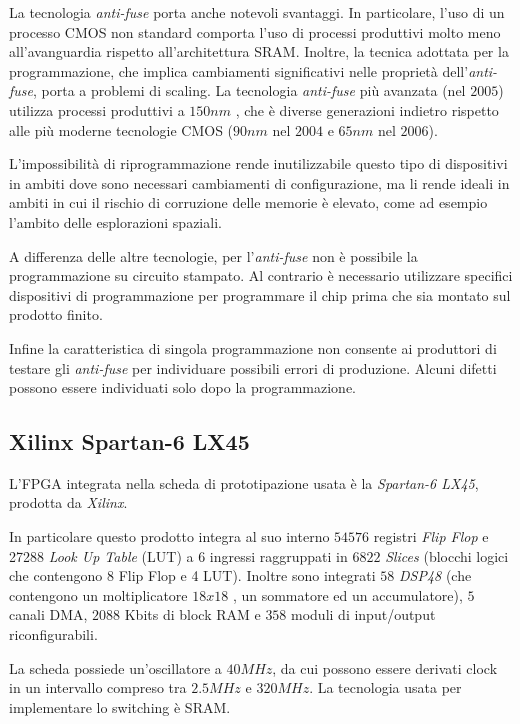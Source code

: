 La tecnologia \textit{anti-fuse} porta anche notevoli svantaggi. In particolare, l'uso di un processo CMOS non standard comporta l'uso di processi produttivi molto meno all'avanguardia rispetto all'architettura SRAM. Inoltre, la tecnica adottata per la programmazione, che implica cambiamenti significativi nelle proprietà dell'\textit{anti-fuse}, porta a problemi di scaling. La tecnologia \textit{anti-fuse} più avanzata (nel $2005$) utilizza processi produttivi a $150nm$ \cite{axfpga}, che è diverse generazioni indietro rispetto alle più moderne tecnologie CMOS ($90nm$ nel $2004$ e $65nm$ nel $2006$).

L'impossibilità di riprogrammazione rende inutilizzabile questo tipo di dispositivi in ambiti dove sono necessari cambiamenti di configurazione, ma li rende ideali in ambiti in cui il rischio di corruzione delle memorie è elevato, come ad esempio l'ambito delle esplorazioni spaziali.

A differenza delle altre tecnologie, per l'\textit{anti-fuse} non è possibile la programmazione su circuito stampato. Al contrario è necessario utilizzare specifici dispositivi di programmazione per programmare il chip prima che sia montato sul prodotto finito.

Infine la caratteristica di singola programmazione non consente ai produttori di testare gli \textit{anti-fuse} per individuare possibili errori di produzione. Alcuni difetti possono essere individuati solo dopo la programmazione.

\subsection{Xilinx Spartan-6 LX45}
L'FPGA integrata nella scheda di prototipazione usata è la \textit{Spartan-6 LX45}, prodotta da \textit{Xilinx}.

In particolare questo prodotto integra al suo interno $54576$ registri \textit{Flip Flop} e 27288 \textit{Look Up Table} (LUT) a 6 ingressi raggruppati in $6822$ \textit{Slices} (blocchi logici che contengono 8 Flip Flop e 4 LUT). Inoltre sono integrati $58$ \textit{DSP48} (che contengono un moltiplicatore $18x18$ , un sommatore ed un accumulatore), $5$ canali DMA, $2088$ Kbits di block RAM e $358$ moduli di input/output riconfigurabili. 

La scheda possiede un'oscillatore a $40MHz$, da cui possono essere derivati clock in un intervallo compreso tra $2.5MHz$ e $320MHz$. La tecnologia usata per implementare lo switching è SRAM. 


